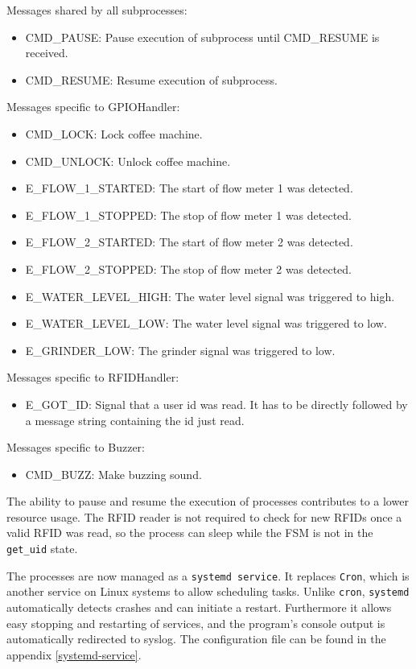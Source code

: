 \documentclass[12pt]{article}
\begin{document}
Messages shared by all subprocesses:
\begin{itemize}
  \item CMD\_PAUSE: Pause execution of subprocess until CMD\_RESUME is received.
  \item CMD\_RESUME: Resume execution of subprocess.
\end{itemize}

Messages specific to GPIOHandler:
\begin{itemize}
  \item CMD\_LOCK: Lock coffee machine.
  \item CMD\_UNLOCK: Unlock coffee machine.
  \item E\_FLOW\_1\_STARTED: The start of flow meter 1 was detected.
  \item E\_FLOW\_1\_STOPPED: The stop of flow meter 1 was detected.
  \item E\_FLOW\_2\_STARTED: The start of flow meter 2 was detected.
  \item E\_FLOW\_2\_STOPPED: The stop of flow meter 2 was detected.
  \item E\_WATER\_LEVEL\_HIGH: The water level signal was triggered to high.
  \item E\_WATER\_LEVEL\_LOW: The water level signal was triggered to low.
  \item E\_GRINDER\_LOW: The grinder signal was triggered to low.
\end{itemize}
Messages specific to RFIDHandler:
\begin{itemize}
  \item E\_GOT\_ID: Signal that a user id was read.
        It has to be directly followed by a message string containing the id just read.
\end{itemize}
Messages specific to Buzzer:
\begin{itemize}
  \item CMD\_BUZZ: Make buzzing sound.
\end{itemize}

The ability to pause and resume the execution of processes
contributes to a lower resource usage.
The RFID reader is not required to check for new RFIDs once a valid RFID was read,
so the process can sleep while the FSM is not in the \texttt{get\_uid} state.

The processes are now managed as a \texttt{systemd service}. It replaces \texttt{Cron}, which is another service on Linux systems to allow scheduling tasks.
Unlike \texttt{cron}, \texttt{systemd} automatically detects crashes and can initiate a restart.
Furthermore it allows easy stopping and restarting of services, and the program's console output is automatically redirected to syslog. 
The configuration file can be found in the appendix \ref{systemd-service}.
\end{document}
